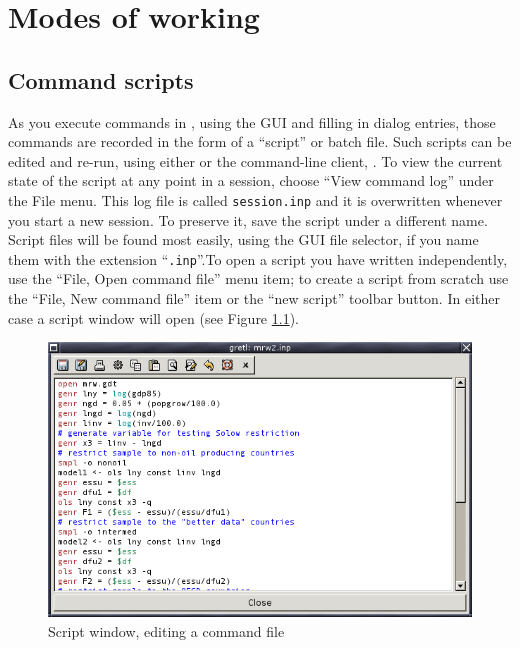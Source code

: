 \chapter{Modes of working}
\label{modes}



\section{Command scripts}
\label{scripts}


As you execute commands in , using the GUI and filling in
dialog entries, those commands are recorded in the form of a
``script'' or batch file.  Such scripts can be edited and re-run,
using either  or the command-line client, .
To view the current state of the script at any point in a 
session, choose ``View command log'' under the File menu. This log
file is called \verb+session.inp+ and it is overwritten whenever you
start a new session.  To preserve it, save the script under a
different name.  Script files will be found most easily, using the GUI
file selector, if you name them with the extension ``\verb+.inp+''.To
open a script you have written independently, use the ``File, Open
command file'' menu item; to create a script from scratch use the
``File, New command file'' item or the ``new script'' toolbar button.
In either case a script window will open (see Figure
\ref{fig-scriptwin}).
\begin{figure}[htbp]
  \caption{Script window, editing a command file}
  \label{fig-scriptwin}
  \begin{center}
    \includegraphics[scale=0.5]{figures/scriptwin}
  \end{center}
\end{figure}
